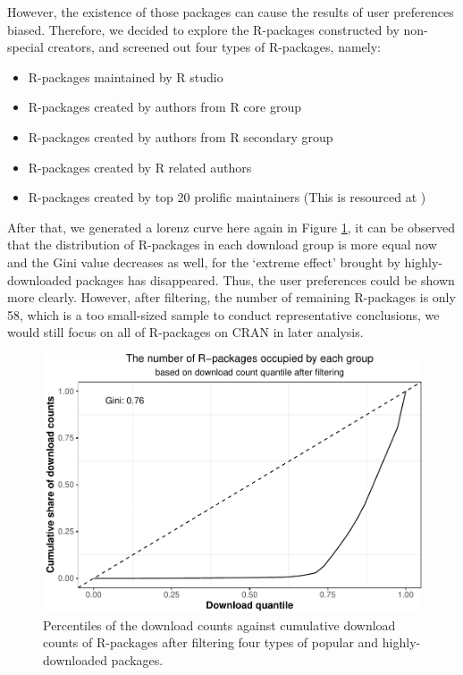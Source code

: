 \documentclass[
]{book}
\providecommand{\tightlist}{%
  \setlength{\itemsep}{0pt}\setlength{\parskip}{0pt}}
\begin{document}
However, the existence of those packages can cause the results of user preferences biased. Therefore, we decided to explore the R-packages constructed by non-special creators, and screened out four types of R-packages, namely:

\begin{itemize}
\tightlist
\item
  R-packages maintained by R studio
\item
  R-packages created by authors from R core group
\item
  R-packages created by authors from R secondary group
\item
  R-packages created by R related authors
\item
  R-packages created by top 20 prolific maintainers (This is resourced at \citet{revolutions})
\end{itemize}

After that, we generated a lorenz curve here again in Figure \ref{fig:lorenz-filter}, it can be observed that the distribution of R-packages in each download group is more equal now and the Gini value decreases as well, for the `extreme effect' brought by highly-downloaded packages has disappeared. Thus, the user preferences could be shown more clearly. However, after filtering, the number of remaining R-packages is only 58, which is a too small-sized sample to conduct representative conclusions, we would still focus on all of R-packages on CRAN in later analysis.



\begin{figure}

{\centering \includegraphics{figures/lorenz-filter-1} 

}

\caption{Percentiles of the download counts against cumulative download counts of R-packages after filtering four types of popular and highly-downloaded packages.}\label{fig:lorenz-filter}
\end{figure}
\end{document}

